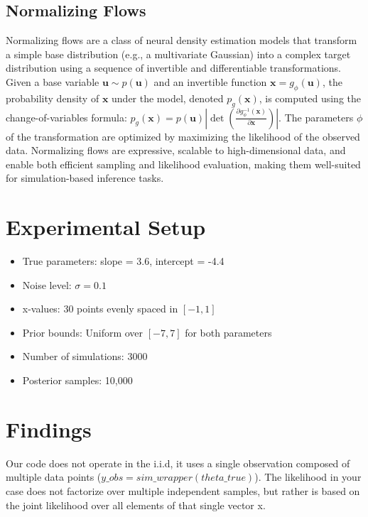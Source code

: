 \documentclass{article}
\begin{document}
\subsection*{Normalizing Flows}
Normalizing flows are a class of neural density estimation models that transform a simple base distribution (e.g., a multivariate Gaussian) into a complex target distribution using a sequence of invertible and differentiable transformations. Given a base variable $\mathbf{u} \sim p(\mathbf{u})$ and an invertible function $\mathbf{x} = g_\phi(\mathbf{u})$, the probability density of $\mathbf{x}$ under the model, denoted $p_g(\mathbf{x})$, is computed using the change-of-variables formula: $p_g(\mathbf{x}) = p(\mathbf{u}) \left| \det \left( \frac{\partial g_\phi^{-1}(\mathbf{x})}{\partial \mathbf{x}} \right) \right|$. The parameters $\phi$ of the transformation are optimized by maximizing the likelihood of the observed data. Normalizing flows are expressive, scalable to high-dimensional data, and enable both efficient sampling and likelihood evaluation, making them well-suited for simulation-based inference tasks.

\section*{Experimental Setup}
\begin{itemize}
    \item True parameters: slope = 3.6, intercept = -4.4
    \item Noise level: $\sigma = 0.1$
    \item x-values: 30 points evenly spaced in $[-1, 1]$
    \item Prior bounds: Uniform over $[-7, 7]$ for both parameters
    \item Number of simulations: 3000
    \item Posterior samples: 10,000
\end{itemize}

\section*{Findings}
Our code does not operate in the i.i.d, it uses a single observation composed of multiple data points ($y\_obs = sim\_wrapper(theta\_true)$). The likelihood in your case does not factorize over multiple independent samples, but rather is based on the joint likelihood over all elements of that single vector x.
\end{document}

